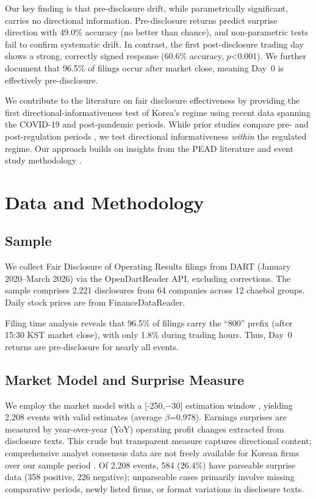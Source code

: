 \documentclass[review,authoryear]{elsarticle}
\begin{document}
Our key finding is that pre-disclosure drift, while parametrically significant, carries no directional information. Pre-disclosure returns predict surprise direction with 49.0\% accuracy (no better than chance), and non-parametric tests fail to confirm systematic drift. In contrast, the first post-disclosure trading day shows a strong, correctly signed response (60.6\% accuracy, $p$<0.001). We further document that 96.5\% of filings occur after market close, meaning Day~0 is effectively pre-disclosure.

We contribute to the literature on fair disclosure effectiveness \citep{heflin2003regulation, bailey2003regulation, eleswarapu2004impact, gomes2007sec} by providing the first directional-informativeness test of Korea's regime using recent data spanning the COVID-19 and post-pandemic periods. While prior studies compare pre- and post-regulation periods \citep{ahmed2003impact, yoon2011impact}, we test directional informativeness \textit{within} the regulated regime. Our approach builds on insights from the PEAD literature \citep{bernard1989post} and event study methodology \citep{brown1985using}.

\section{Data and Methodology}

\subsection{Sample}

We collect Fair Disclosure of Operating Results filings from DART (January 2020--March 2026) via the OpenDartReader API, excluding corrections. The sample comprises 2,221 disclosures from 64 companies across 12 chaebol groups. Daily stock prices are from FinanceDataReader.

Filing time analysis reveals that 96.5\% of filings carry the ``800'' prefix (after 15:30 KST market close), with only 1.8\% during trading hours. Thus, Day~0 returns are pre-disclosure for nearly all events.

\subsection{Market Model and Surprise Measure}

We employ the market model with a [-250,$-$30] estimation window \citep{mackinlay1997event}, yielding 2,208 events with valid estimates (average $\beta$=0.978). Earnings surprises are measured by year-over-year (YoY) operating profit changes extracted from disclosure texts. This crude but transparent measure captures directional content; comprehensive analyst consensus data are not freely available for Korean firms over our sample period \citep{livnat2006comparing}. Of 2,208 events, 584 (26.4\%) have parseable surprise data (358 positive, 226 negative); unparseable cases primarily involve missing comparative periods, newly listed firms, or format variations in disclosure texts.
\end{document}
